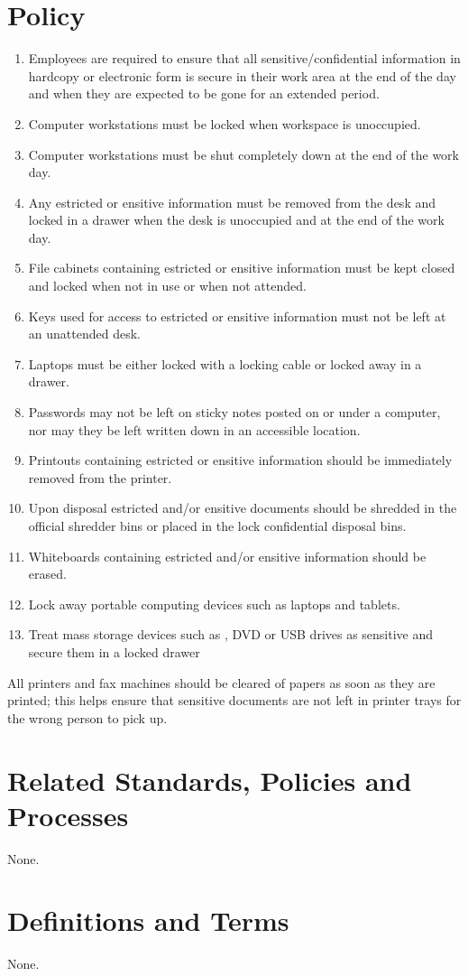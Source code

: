 \section{Policy}
\begin{enumerate}
\item
Employees are required to ensure that all sensitive/confidential information in hardcopy or electronic form is secure in their work area at the end of the day and when they are expected to be gone for an extended period. 
\item
Computer workstations must be locked when workspace is unoccupied.
\item
Computer workstations must be shut completely down at the end of the work day. 
\item
Any estricted or ensitive information must be removed from the desk and locked in a drawer when the desk is unoccupied and at the end of the work day.
\item
File cabinets containing estricted or ensitive information must be kept closed and locked when not in use or when not attended. 
\item
Keys used for access to estricted or ensitive information must not be left at an unattended desk. 
\item
Laptops must be either locked with a locking cable or locked away in a drawer. 
\item
Passwords may not be left on sticky notes posted on or under a computer, nor may they be left written down in an accessible location. 
\item
Printouts containing estricted or ensitive information should be immediately removed from the printer. 
\item
Upon disposal estricted and/or ensitive documents should be shredded in the official shredder bins or placed in the lock confidential disposal bins.
\item
Whiteboards containing estricted and/or ensitive information should be erased.
\item
Lock away portable computing devices such as laptops and tablets.
\item
Treat mass storage devices such as \cdrom{}, DVD or USB drives as sensitive and secure them in a locked drawer
\end{enumerate}
All printers and fax machines should be cleared of papers as soon as they are printed; this helps ensure that sensitive documents are not left in printer trays for the wrong person to pick up.
\CommonPolicyCompliance
\section{Related Standards, Policies\oxford{} and Processes}
None.
\section{Definitions and Terms}
None.
\CommonRevisionHistory

